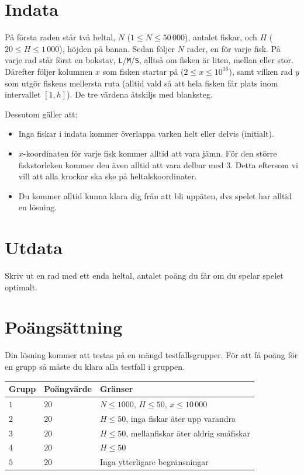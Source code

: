 \section*{Indata}

På första raden står två heltal, $N$ ($1 \leq N \leq 50\,000$), antalet fiskar, och $H$ ($20 \leq H \leq 1\,000$), höjden på banan. Sedan följer $N$ rader,
en för varje fisk. På varje rad står först en bokstav, \texttt{L}/\texttt{M}/\texttt{S}, alltså om fisken är liten, mellan eller stor. Därefter följer kolumnen $x$ som fisken startar på ($2 \leq x \leq 10^{16}$), samt vilken rad $y$ som utgör fiskens mellersta ruta (alltid vald så att hela fisken får plats inom intervallet $[1, h]$). De tre värdena åtskiljs med blanksteg.

Dessutom gäller att:
\begin{itemize}
  \item
    Inga fiskar i indata kommer överlappa varken helt eller delvis (initialt).
  \item
      $x$-koordinaten för varje fisk kommer alltid att vara jämn. För den större
      fiskstorleken kommer den även alltid att vara delbar med 3. Detta
      eftersom vi vill att alla krockar ska ske på heltalskoordinater.
  \item
    Du kommer alltid kunna klara dig från att bli uppäten, dvs spelet har
    alltid en lösning.
\end{itemize}

\section*{Utdata}
Skriv ut en rad med ett enda heltal, antalet poäng du får om du spelar spelet optimalt.

\section*{Poängsättning}
Din lösning kommer att testas på en mängd testfallsgrupper.
För att få poäng för en grupp så måste du klara alla testfall i gruppen.

\noindent
\begin{tabular}{| l | l | l |}
  \hline
  Grupp & Poängvärde & Gränser \\ \hline
  $1$   & $20$       & $N \leq 1000$, $H \leq 50$, $x \leq 10\,000$ \\ \hline
  $2$   & $20$       & $H \leq 50$, inga fiskar äter upp varandra \\ \hline
  $3$   & $20$       & $H \leq 50$, mellanfiskar äter aldrig småfiskar \\ \hline
  $4$   & $20$       & $H \leq 50$ \\ \hline
  $5$   & $20$       & Inga ytterligare begränsningar \\ \hline
\end{tabular}

